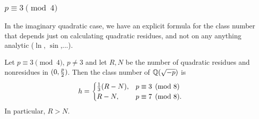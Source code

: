 \subsubsection{$p\equiv 3\pmod 4$}
In the imaginary quadratic case, we have an explicit formula for the class number that depends just on calculating quadratic residues, and not on any anything analytic ($\ln$, $\sin$,...).

\begin{thm}
Let $p\equiv 3\pmod 4$, $p\ne 3$ and let $R,N$ be the number of quadratic residues and nonresidues in $(0,\frac{p}{2})$. Then the class number of $\mathbb{Q}(\sqrt{-p})$ is 
\[
h=\begin{cases}
\frac{1}{3} (R-N),&p\equiv 3\pmod 8\\
R-N,&p\equiv 7\pmod 8.
\end{cases}
\]
In particular, $R>N$.
\end{thm}
